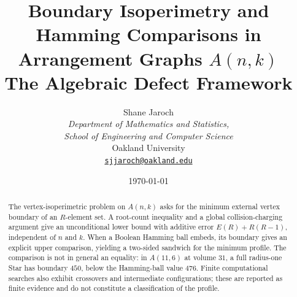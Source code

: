 \documentclass[11pt, letterpaper]{article}
\title{%
\textbf{Boundary Isoperimetry and Hamming Comparisons in Arrangement Graphs $A(n,k)$}\\[0.5em]
  The Algebraic Defect Framework\\[0.5em]
}
\author{%
  Shane Jaroch \\
  \small \textit{Department of Mathematics and Statistics,} \\
  \small \textit{School of Engineering and Computer Science} \\
  \small Oakland University \\
  \small \href{mailto:sjjaroch@oakland.edu}{\texttt{sjjaroch@oakland.edu}}
}
\date{\today}
\theoremstyle{definition}
\theoremstyle{remark}
\begin{document}
\maketitle

\begin{abstract}
The vertex-isoperimetric problem on $A(n,k)$ asks for the minimum external
vertex boundary of an $R$-element set. A root-count inequality and a global
collision-charging argument give an unconditional lower bound with additive
error $E(R)+R(R-1)$, independent of $n$ and $k$. When a Boolean Hamming
ball embeds, its boundary gives an explicit upper comparison, yielding a
two-sided sandwich for the minimum profile. The comparison is not in general
an equality: in $A(11,6)$ at volume $31$, a full radius-one Star has boundary
$450$, below the Hamming-ball value $476$. Finite computational searches
also exhibit crossovers and intermediate configurations; these are reported
as finite evidence and do not constitute a classification of the profile.
\end{abstract}





















\end{document}
